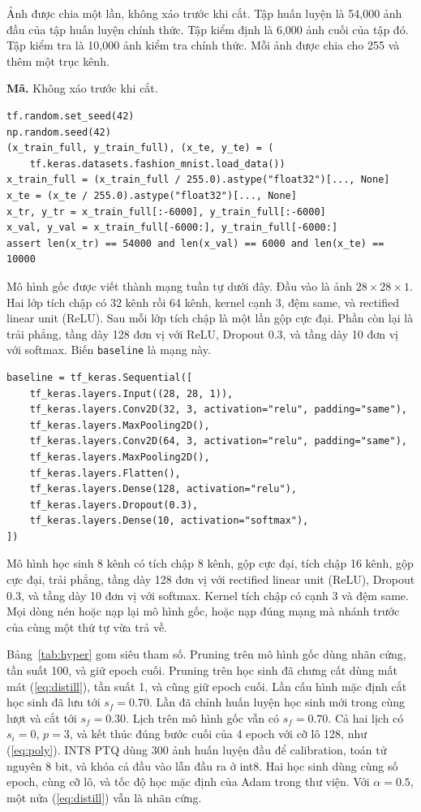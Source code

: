 \documentclass[13pt,a4paper]{article}
\begin{document}
Ảnh được chia một lần, không xáo trước khi cắt.
Tập huấn luyện là 54{,}000 ảnh đầu của tập huấn luyện chính thức.
Tập kiểm định là 6{,}000 ảnh cuối của tập đó.
Tập kiểm tra là 10{,}000 ảnh kiểm tra chính thức.
Mỗi ảnh được chia cho 255 và thêm một trục kênh.

\filbreak
\noindent\textbf{Mã.}
Không xáo trước khi cắt.

\nopagebreak
{\fontsize{8}{9.2}\selectfont
\begin{verbatim}
tf.random.set_seed(42)
np.random.seed(42)
(x_train_full, y_train_full), (x_te, y_te) = (
    tf.keras.datasets.fashion_mnist.load_data())
x_train_full = (x_train_full / 255.0).astype("float32")[..., None]
x_te = (x_te / 255.0).astype("float32")[..., None]
x_tr, y_tr = x_train_full[:-6000], y_train_full[:-6000]
x_val, y_val = x_train_full[-6000:], y_train_full[-6000:]
assert len(x_tr) == 54000 and len(x_val) == 6000 and len(x_te) == 10000
\end{verbatim}
}

Mô hình gốc được viết thành mạng tuần tự dưới đây.
Đầu vào là ảnh \(28\times 28\times 1\).
Hai lớp tích chập có 32 kênh rồi 64 kênh, kernel cạnh 3, đệm same, và rectified linear unit (ReLU).
Sau mỗi lớp tích chập là một lần gộp cực đại.
Phần còn lại là trải phẳng, tầng dày 128 đơn vị với ReLU, Dropout 0.3, và tầng dày 10 đơn vị với softmax.
Biến \texttt{baseline} là mạng này.

\nopagebreak
{\fontsize{8}{9.2}\selectfont
\begin{verbatim}
baseline = tf_keras.Sequential([
    tf_keras.layers.Input((28, 28, 1)),
    tf_keras.layers.Conv2D(32, 3, activation="relu", padding="same"),
    tf_keras.layers.MaxPooling2D(),
    tf_keras.layers.Conv2D(64, 3, activation="relu", padding="same"),
    tf_keras.layers.MaxPooling2D(),
    tf_keras.layers.Flatten(),
    tf_keras.layers.Dense(128, activation="relu"),
    tf_keras.layers.Dropout(0.3),
    tf_keras.layers.Dense(10, activation="softmax"),
])
\end{verbatim}
}

Mô hình học sinh 8 kênh có tích chập 8 kênh, gộp cực đại, tích chập 16 kênh, gộp cực đại, trải phẳng, tầng dày 128 đơn vị với rectified linear unit (ReLU), Dropout 0.3, và tầng dày 10 đơn vị với softmax.
Kernel tích chập có cạnh 3 và đệm same.
Mọi dòng nén hoặc nạp lại mô hình gốc, hoặc nạp đúng mạng mà nhánh trước của cùng một thứ tự vừa trả về.

Bảng~\ref{tab:hyper} gom siêu tham số.
Pruning trên mô hình gốc dùng nhãn cứng, tần suất 100, và giữ epoch cuối.
Pruning trên học sinh đã chưng cất dùng mất mát (\ref{eq:distill}), tần suất 1, và cũng giữ epoch cuối.
Lần cấu hình mặc định cắt học sinh đã lưu tới \(s_f = 0.70\).
Lần đã chỉnh huấn luyện học sinh mới trong cùng lượt và cắt tới \(s_f = 0.30\).
Lịch trên mô hình gốc vẫn có \(s_f = 0.70\).
Cả hai lịch có \(s_i = 0\), \(p = 3\), và kết thúc đúng bước cuối của 4 epoch với cỡ lô 128, như (\ref{eq:poly}).
INT8 PTQ dùng 300 ảnh huấn luyện đầu để calibration, toán tử nguyên 8 bit, và khóa cả đầu vào lẫn đầu ra ở int8.
Hai học sinh dùng cùng số epoch, cùng cỡ lô, và tốc độ học mặc định của Adam trong thư viện.
Với \(\alpha = 0.5\), một nửa (\ref{eq:distill}) vẫn là nhãn cứng.
\end{document}
